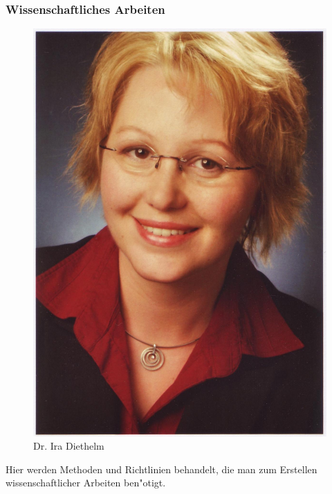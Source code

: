 \subsubsection{Wissenschaftliches Arbeiten}

\begin{figure}[h]
	\centering\includegraphics[width=0.7\linewidth]{bilder/dozenten/diethelm.jpg}\\
	{Dr. Ira Diethelm}
\end{figure}
Hier werden Methoden und Richtlinien behandelt, die man zum Erstellen
wissenschaftlicher Arbeiten ben"otigt.
